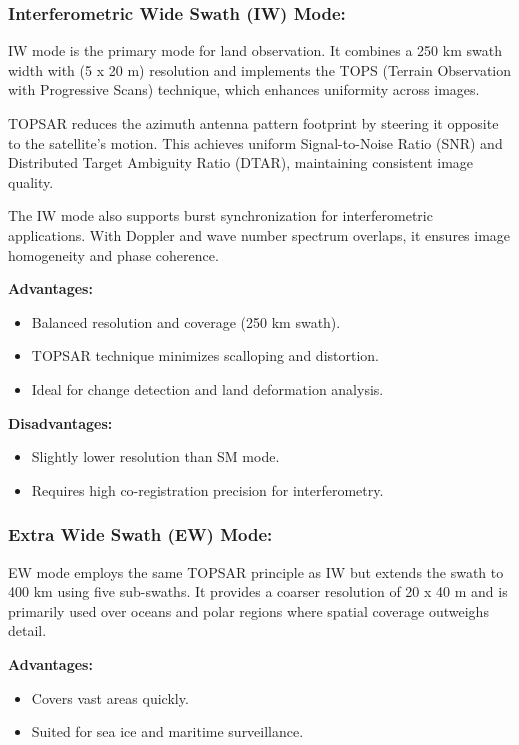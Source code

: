 \subsubsection{\textbf{Interferometric Wide Swath (IW) Mode:}}

IW mode is the primary mode for land observation. It combines a 250 km swath width with (5 x 20 m) resolution and implements the TOPS (Terrain Observation with Progressive Scans) technique, which enhances uniformity across images.

TOPSAR reduces the azimuth antenna pattern footprint by steering it opposite to the satellite’s motion. This achieves uniform Signal-to-Noise Ratio (SNR) and Distributed Target Ambiguity Ratio (DTAR), maintaining consistent image quality.

The IW mode also supports burst synchronization for interferometric applications. With Doppler and wave number spectrum overlaps, it ensures image homogeneity and phase coherence.


\textbf{Advantages:}
\begin{itemize}
    \item Balanced resolution and coverage (250 km swath).
    \item TOPSAR technique minimizes scalloping and distortion.
    \item Ideal for change detection and land deformation analysis.
\end{itemize}

\textbf{Disadvantages:}
\begin{itemize}
    \item Slightly lower resolution than SM mode.
    \item Requires high co-registration precision for interferometry.
\end{itemize}

\subsubsection{\textbf{Extra Wide Swath (EW) Mode:} }

EW mode employs the same TOPSAR principle as IW but extends the swath to 400 km using five sub-swaths. It provides a coarser resolution of 20 x 40 m and is primarily used over oceans and polar regions where spatial coverage outweighs detail.


\textbf{Advantages:}
\begin{itemize}
    \item Covers vast areas quickly.
    \item Suited for sea ice and maritime surveillance.
\end{itemize}


